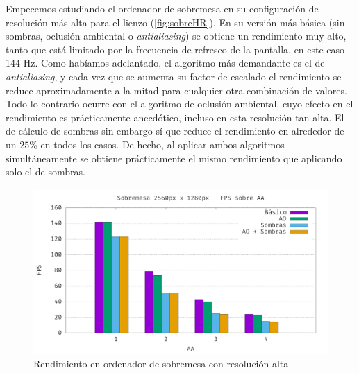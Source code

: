 Empecemos estudiando el ordenador de sobremesa en su configuración de resolución más alta para el lienzo (\autoref{fig:sobreHR}). En su versión más básica (sin sombras, oclusión ambiental o \textit{antialiasing}) se obtiene un rendimiento muy alto, tanto que está limitado por la frecuencia de refresco de la pantalla, en este caso 144 Hz. Como habíamos adelantado, el algoritmo más demandante es el de \textit{antialiasing}, y cada vez que se aumenta su factor de escalado el rendimiento se reduce aproximadamente a la mitad para cualquier otra combinación de valores. Todo lo contrario ocurre con el algoritmo de oclusión ambiental, cuyo efecto en el rendimiento es prácticamente anecdótico, incluso en esta resolución tan alta. El de cálculo de sombras sin embargo sí que reduce el rendimiento en alrededor de un $25\%$ en todos los casos. De hecho, al aplicar ambos algoritmos simultáneamente se obtiene prácticamente el mismo rendimiento que aplicando solo el de sombras.\newline
\begin{figure}[ht!]
    \centering
    \includegraphics[width=\textwidth]{Plantilla-TFG-master/img/graficas/SobremesaHR.png}
    \caption{Rendimiento en ordenador de sobremesa con resolución alta}
    \label{fig:sobreHR}
\end{figure}

